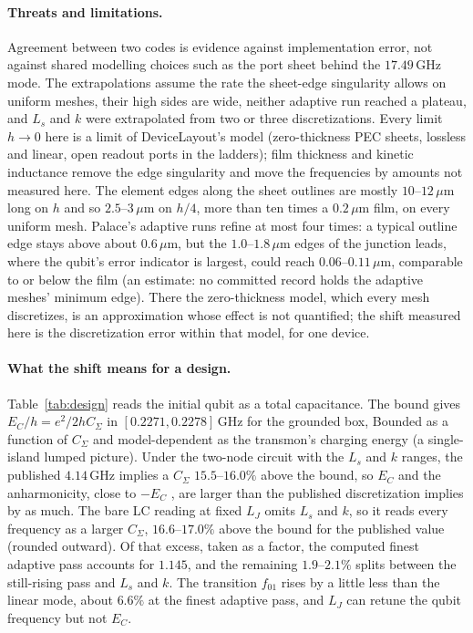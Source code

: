 \documentclass{anvil-paper}
\begin{document}
\paragraph{Threats and limitations.}
Agreement between two codes is evidence against implementation error, not
against shared modelling choices such as the port sheet behind the
$17.49$\,GHz mode. The extrapolations assume the rate the sheet-edge
singularity allows on uniform meshes, their high sides are wide, neither
adaptive run reached a plateau, and $L_s$ and $k$ were extrapolated from
two or three discretizations. Every limit $h \to 0$ here is a limit of
DeviceLayout's model (zero-thickness PEC sheets, lossless and linear, open
readout ports in the ladders); film thickness and kinetic inductance remove
the edge singularity and move the frequencies by amounts not measured
here. The element edges
along the sheet outlines are mostly $10$--$12\,\mu$m long on $h$ and so
$2.5$--$3\,\mu$m on $h/4$, more than ten times a $0.2\,\mu$m film, on
every uniform mesh. Palace's adaptive runs refine at most four times: a
typical outline edge stays above about $0.6\,\mu$m, but the
$1.0$--$1.8\,\mu$m edges of the junction leads, where the qubit's error
indicator is largest, could reach $0.06$--$0.11\,\mu$m, comparable to or
below the film (an estimate: no committed record holds the adaptive
meshes' minimum edge). There the zero-thickness model, which every mesh
discretizes, is an approximation whose effect is not quantified; the shift
measured here is the discretization error within that model, for one
device.

\paragraph{What the shift means for a design.}
Table~\ref{tab:design} reads the initial qubit as a total capacitance. The
bound gives $E_C/h = e^2/2hC_\Sigma$ in $[0.2271, 0.2278]$\,GHz for the
grounded box, Bounded as a function of $C_\Sigma$ and model-dependent as
the transmon's charging energy (a single-island lumped picture). Under the
two-node circuit with the $L_s$ and $k$ ranges, the published $4.14$\,GHz
implies a $C_\Sigma$ $15.5$--$16.0\%$ above the bound, so $E_C$ and the
anharmonicity, close to $-E_C$ \citep{koch2007charge}, are larger than the
published discretization implies by as much. The bare LC reading at fixed
$L_J$ omits $L_s$ and $k$, so it reads every frequency as a larger
$C_\Sigma$, $16.6$--$17.0\%$ above the bound for the published value
(rounded outward). Of that excess, taken as a factor, the computed finest adaptive pass accounts
for $1.145$, and the remaining $1.9$--$2.1\%$ splits between the still-rising pass and $L_s$ and $k$. The transition $f_{01}$ rises by a
little less than the linear mode, about $6.6\%$ at the finest adaptive pass, and
$L_J$ can retune the qubit frequency but not $E_C$.
\end{document}
